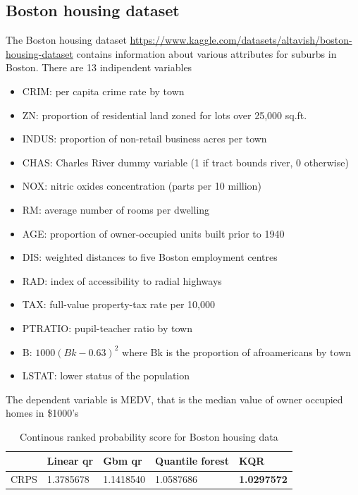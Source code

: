 \subsection{Boston housing dataset}
The Boston housing dataset \url{https://www.kaggle.com/datasets/altavish/boston-housing-dataset} contains information about various attributes for suburbs in Boston.
There are 13 indipendent variables
\begin{itemize}
\item CRIM: per capita crime rate by town
\item ZN: proportion of residential land zoned for lots over 25,000 sq.ft.\
\item INDUS: proportion of non-retail business acres per town
\item CHAS: Charles River dummy variable (1 if tract bounds river, 0 otherwise)
\item NOX: nitric oxides concentration (parts per 10 million)
\item RM: average number of rooms per dwelling
\item AGE: proportion of owner-occupied units built prior to 1940
\item DIS: weighted distances to five Boston employment centres
\item RAD: index of accessibility to radial highways
\item TAX: full-value property-tax rate per 10,000
\item PTRATIO: pupil-teacher ratio by town
\item B: $1000(Bk - 0.63)^2$ where Bk is the proportion of afroamericans by town
\item LSTAT: lower status of the population
\end{itemize}
The dependent variable is MEDV, that is the median value of owner occupied homes in \$1000's

\begin{table}
\caption{Continous ranked probability score for Boston housing data}
\begin{tabular}{lllll}
\toprule
    & Linear qr & Gbm qr & Quantile forest & KQR \\
\midrule
CRPS & 1.3785678 & 1.1418540 & 1.0587686 & \textbf{1.0297572} \\
\bottomrule
\end{tabular}
\end{table}

